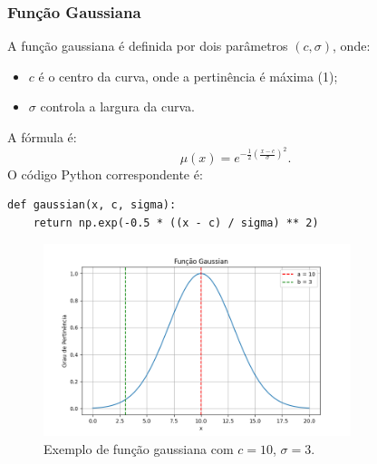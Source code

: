 \documentclass[a4paper,12pt]{article}
\begin{document}
\subsubsection{Função Gaussiana}
A função gaussiana é definida por dois parâmetros $(c, \sigma)$, onde:
\begin{itemize}
    \item $c$ é o centro da curva, onde a pertinência é máxima (1);
    \item $\sigma$ controla a largura da curva.
\end{itemize}
A fórmula é:
\[
\mu(x) = e^{-\frac{1}{2} \left( \frac{x - c}{\sigma} \right)^2}.
\]
O código Python correspondente é:
\begin{verbatim}
def gaussian(x, c, sigma):
    return np.exp(-0.5 * ((x - c) / sigma) ** 2)
\end{verbatim}
\begin{figure}[H]
    \centering
    \includegraphics[width=0.8\textwidth]{img/gaussian.png}
    \caption{Exemplo de função gaussiana com $c=10$, $\sigma=3$.}
\end{figure}
\end{document}

